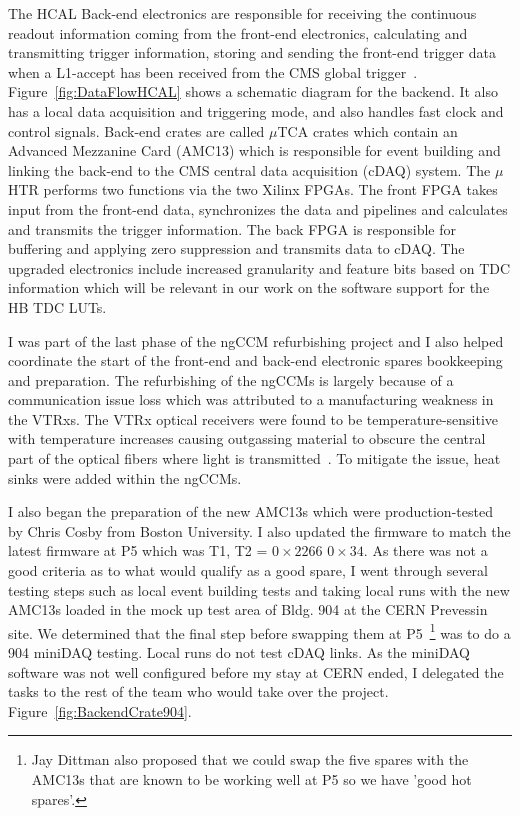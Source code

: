 The HCAL Back-end electronics are responsible for receiving the continuous readout information coming from the front-end electronics, calculating and transmitting trigger information, storing and sending the front-end trigger data when a L1-accept has been received from the CMS global trigger~\cite{Cooper:2016kef}. Figure~\ref{fig:DataFlowHCAL} shows a schematic diagram for the backend. It also has a local data acquisition and triggering mode, and also handles fast clock and control signals. Back-end crates are called $\mu$TCA crates which contain an Advanced Mezzanine Card (AMC13) which is responsible for event building and linking the back-end to the CMS central data acquisition (cDAQ) system. The $\mu$HTR performs two functions via the two Xilinx FPGAs. The front FPGA takes input from the front-end data, synchronizes the data and pipelines and calculates and transmits the trigger information. The back FPGA is responsible for buffering and applying zero suppression and transmits data to cDAQ. The upgraded electronics include increased granularity and feature bits based on TDC information which will be relevant in our work on the software support for the HB TDC LUTs. 

I was part of the last phase of the ngCCM refurbishing project and I also helped coordinate the start of the front-end and back-end electronic spares bookkeeping and preparation. The refurbishing of the ngCCMs is largely because of a communication issue loss which was attributed to a manufacturing weakness in the VTRxs. The VTRx optical receivers were found to be temperature-sensitive with temperature increases causing outgassing material to obscure the central part of the optical fibers where light is transmitted~\cite{Cummings:2022kgm}. To mitigate the issue, heat sinks were added within the ngCCMs. 

I also began the preparation of the new AMC13s which were production-tested by Chris Cosby from Boston University. I also updated the firmware to match the latest firmware at P5 which was T1, T2 = $0\times2266$ $0\times34$. As there was not a good criteria as to what would qualify as a good spare, I went through several testing steps such as local event building tests and taking local runs with the new AMC13s loaded in the mock up test area of Bldg. 904 at the CERN Prevessin site. We determined that the final step before swapping them at P5~\footnote{Jay Dittman also proposed that we could swap the five spares with the AMC13s that are known to be working well at P5 so we have 'good hot spares'.} was to do a 904 miniDAQ testing. Local runs do not test cDAQ links. As the miniDAQ software was not well configured before my stay at CERN ended, I delegated the tasks to the rest of the team who would take over the project. Figure~\ref{fig:BackendCrate904}.

